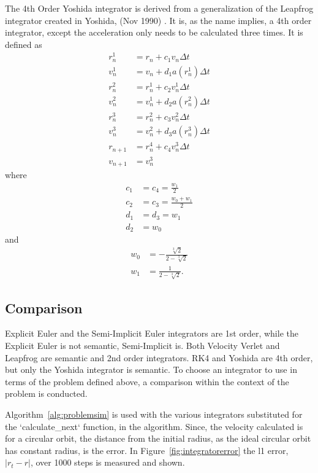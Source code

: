 The 4th Order Yoshida integrator is derived from a generalization of the Leapfrog integrator created in Yoshida, (Nov 1990) \cite{yoshida_1990}. It is, as the name implies, a 4th order integrator, except the acceleration only needs to be calculated three times. It is defined as 
\begin{align*}
r_n^1 &= r_n + c_1 v_n \Delta t \\
v_n^1 &= v_n + d_1 a(r_n^1) \Delta t \\
r_n^2 &= r_n^1 + c_2 v_n^1 \Delta t \\
v_n^2 &= v_n^1 + d_2 a(r_n^2) \Delta t \\
r_n^3 &= r_n^2 + c_3 v_n^2 \Delta t \\
v_n^3 &= v_n^2 + d_3 a(r_n^3) \Delta t \\
r_{n+1} &= r_n^4 + c_4 v_n^3 \Delta t \\
v_{n+1} &= v_n^3
\end{align*}
where 
\begin{align*}
c_1&=c_4=\frac{w_1}{2} \\
c_2&=c_3=\frac{w_0+w_1}{2}\\
d_1&=d_3=w_1\\
d_2&=w_0
\end{align*}
and
\begin{align*}
w_0&=-\frac{\sqrt[3]{2}}{2-\sqrt[3]{2}}\\
w_1&=\frac{1}{2-\sqrt[3]{2}}.
\end{align*}

\subsection{Comparison}

Explicit Euler and the Semi-Implicit Euler integrators are 1st order, while the Explicit Euler is not semantic, Semi-Implicit is. Both Velocity Verlet and Leapfrog are semantic and 2nd order integrators. RK4 and Yoshida are 4th order, but only the Yoshida integrator is semantic. To choose an integrator to use in terms of the problem defined above, a comparison within the context of the problem is conducted. 

Algorithm~\ref{alg:problemsim} is used with the various integrators substituted for the `calculate\_next` function, in the algorithm. Since, the velocity calculated is for a circular orbit, the distance from the initial radius, as the ideal circular orbit has constant radius, is the error. In Figure~\ref{fig:integratorerror} the l1 error, $|r_t-r|$, over 1000 steps is measured and shown. 

